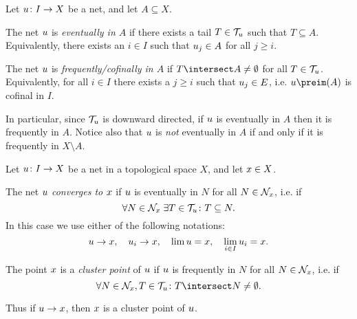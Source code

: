 \documentclass[article, a4paper, 11pt, oneside]{memoir}
\numberwithin{equation}{chapter}
\theoremstyle{nonumberplain}
\begin{document}
\begin{definition}
    Let $u \colon I \to X$ be a net, and let $A \subseteq X$.
    \begin{enumdef}
        \item The net $u$ is \emph{eventually in $A$} if there exists a tail $T \in \mathcal{T}_{u}$ such that $T \subseteq A$. Equivalently, there exists an $i \in I$ such that $u_j \in A$ for all $j \geq i$.

        \item The net $u$ is \emph{frequently/cofinally in $A$} if $T \intersect A \neq \emptyset$ for all $T \in \mathcal{T}_{u}$. Equivalently, for all $i \in I$ there exists a $j \geq i$ such that $u_j \in E$, i.e. $\mynet\preim(A)$ is cofinal in $I$.
    \end{enumdef}
\end{definition}
%
In particular, since $\mathcal{T}_{u}$ is downward directed, if $u$ is eventually in $A$ then it is frequently in $A$. Notice also that $u$ is \emph{not} eventually in $A$ if and only if it is frequently in $X \setminus A$.

\begin{definition}
    Let $u \colon I \to X$ be a net in a topological space $X$, and let $x \in X$.
    \begin{enumdef}
        \item The net $u$ \emph{converges to $x$} if $u$ is eventually in $N$ for all $N \in \mathcal{N}_{x}$, i.e. if
        \begin{equation*}
            \forall N \in \mathcal{N}_{x} \; \exists T \in \mathcal{T}_{u} \colon T \subseteq N.
        \end{equation*}
        In this case we use either of the following notations:
        \begin{equation*}
            u \to x, \quad
            u_i \to x, \quad
            \lim u = x, \quad
            \lim_{i \in I} u_i = x.
        \end{equation*}

        \item The point $x$ is a \emph{cluster point} of $u$ if $u$ is frequently in $N$ for all $N \in \mathcal{N}_{x}$, i.e. if
        \begin{equation*}
            \forall N \in \nhoods{\mylimit}, T \in \tails{\mynet} \colon T \intersect N \neq \emptyset.
        \end{equation*}
    \end{enumdef}
\end{definition}
%
Thus if $u \to x$, then $x$ is a cluster point of $u$.
\end{document}
